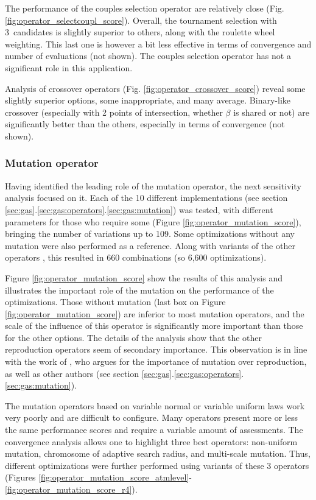 \documentclass{ametsoc}
\begin{document}
The performance of the couples selection operator are relatively close (Fig. \ref{fig:operator_selectcoupl_score}). Overall, the tournament selection with 3~candidates is slightly superior to others, along with the roulette wheel weighting. This last one is however a bit less effective in terms of convergence and number of evaluations (not shown). The couples selection operator has not a significant role in this application. 

Analysis of crossover operators (Fig. \ref{fig:operator_crossover_score}) reveal some slightly superior options, some inappropriate, and many average. Binary-like crossover (especially with 2 points of intersection, whether $\beta$ is shared or not) are significantly better than the others, especially in terms of convergence (not shown).
	

\subsubsection{Mutation operator}
\label{sec:assessment:mutation}

Having identified the leading role of the mutation operator, the next sensitivity analysis focused on it. Each of the 10 different implementations (see section \ref{sec:gas}.\ref{sec:gas:operators}.\ref{sec:gas:mutation}) was tested, with different parameters for those who require some (Figure \ref{fig:operator_mutation_score}), bringing the number of variations up to 109. Some optimizations without any mutation were also performed as a reference. Along with variants of the other operators \citep[see][for the details]{Horton2012a}, this resulted in 660 combinations (so 6,600 optimizations).

Figure \ref{fig:operator_mutation_score} show the results of this analysis and illustrates the important role of the mutation on the performance of the optimizations. Those without mutation (last box on Figure \ref{fig:operator_mutation_score}) are inferior to most mutation operators, and the scale of the influence of this operator is significantly more important than those for the other options. The details of the analysis \citep[see][]{Horton2012a} show that the other reproduction operators seem of secondary importance. This observation is in line with the work of \citet{Back1996a}, who argues for the importance of mutation over reproduction, as well as other authors (see section \ref{sec:gas}.\ref{sec:gas:operators}.\ref{sec:gas:mutation}).

The mutation operators based on variable normal or variable uniform laws work very poorly and are difficult to configure. Many operators present more or less the same performance scores and require a variable amount of assessments. The convergence analysis \citep[see][]{Horton2012a} allows one to highlight three best operators: non-uniform mutation, chromosome of adaptive search radius, and multi-scale mutation. Thus, different optimizations were further performed using variants of these 3 operators (Figures \ref{fig:operator_mutation_score_atmlevel}-\ref{fig:operator_mutation_score_r4}).
\end{document}
